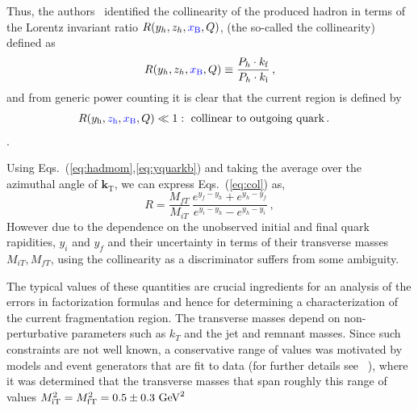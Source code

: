 \documentclass[final,3p,times,onecolumn,sort&compress,hidelinks]{elsarticle}
\newcommand{\xbj}{\ensuremath{{\cbl x_{\rm B}}}}
\newcommand{\zh}{\ensuremath{{\cbl z_{\rm h}}}}
\newcommand{\Tsc}[2]{#1_{#2\text{T}}}
\newcommand{\Tscsq}[2]{#1^2_{#2\text{T}}}
\newcommand{\initq}{\ensuremath{k_{\rm i}}}
\newcommand{\finalq}{\ensuremath{k_{\rm f}}}
\newcommand{\hady}{\ensuremath{y_{\rm h}}}
\newcommand{\inity}{\ensuremath{y_{\rm i}}}
\newcommand{\finaly}{\ensuremath{y_{\rm f}}}
\newcommand{\ratiocur}{\ensuremath{R}}
\newcommand{\T}[2]{\boldsymbol{#1}_{#2\text{T}}}
\newcommand\3[1]{\boldsymbol{#1}}
\newcommand{\cbl}{\color{blue}}
\begin{document}
Thus, the authors~\cite{Boglione:2016bph} identified the collinearity of the produced hadron in terms of the Lorentz invariant ratio $R(y_h,z_h,\xbj,Q)$,
(the so-called the collinearity) defined as
\begin{equation}
  R(y_h,z_h,\xbj,Q)\equiv \frac{P_h\cdot \finalq}{P_h\cdot \initq}\, ,
  \label{eq:col}
\end{equation}
and from generic power counting it is clear that the current region is
defined by
\begin{align}
\ratiocur(\hady,\zh,\xbj,Q) \ll 1 &:~ \text{collinear to outgoing quark} \, .
\end{align}.


Using Eqs.~(\ref{eq:hadmom},\ref{eq:yquarkb}) and taking the average over the azimuthal angle of
$\T{k}{}$, we can express Eqs.~(\ref{eq:col}) as,
\begin{equation}
R = \frac{M_{fT}} {M_{iT}}\,\frac{e^{y_f-y_h}+e^{y_h-y_f}} {e^{y_i-y_h}-e^{y_h-y_i}}\,,
\label{eq:colrapid}
\end{equation}
However due to the  dependence on the unobserved 
initial and final quark rapidities, $y_i$ and $y_f$ and their uncertainty in terms of their transverse masses  $M_{iT},  M_{fT}$, using the collinearity as a discriminator suffers from some ambiguity.


The typical values of these quantities are crucial ingredients for an
analysis of the errors in factorization formulas and hence for
determining a characterization of the current fragmentation region.
The transverse masses depend on non-perturbative parameters such as
$k_T$ and the jet and remnant masses. Since such constraints are not well known,
a conservative range of values was motivated by models and event generators that are fit to data (for further details see ~\cite{Boglione:2016bph}), 
where it was determined that the  transverse masses that span roughly this range of values
$\Tsc{M}{\rm i}^2 = \Tsc{M}{\rm f}^2 = 0.5 \pm 0.3~{\rm GeV}^2 $
  
\end{document}
